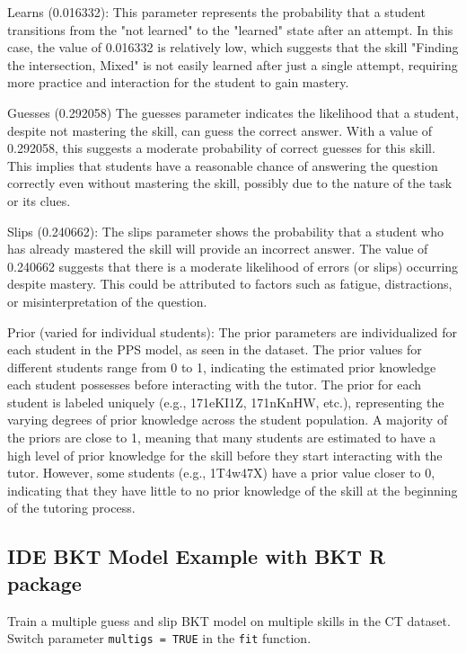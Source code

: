 \documentclass{article}
\begin{document}
Learns (0.016332): This parameter represents the probability that a student transitions from the "not learned" to the "learned" state after an attempt. In this case, the value of 0.016332 is relatively low, which suggests that the skill "Finding the intersection, Mixed" is not easily learned after just a single attempt, requiring more practice and interaction for the student to gain mastery.

Guesses (0.292058) The guesses parameter indicates the likelihood that a student, despite not mastering the skill, can guess the correct answer. With a value of 0.292058, this suggests a moderate probability of correct guesses for this skill. This implies that students have a reasonable chance of answering the question correctly even without mastering the skill, possibly due to the nature of the task or its clues.

Slips (0.240662): The slips parameter shows the probability that a student who has already mastered the skill will provide an incorrect answer. The value of 0.240662 suggests that there is a moderate likelihood of errors (or slips) occurring despite mastery. This could be attributed to factors such as fatigue, distractions, or misinterpretation of the question.

Prior (varied for individual students): The prior parameters are individualized for each student in the PPS model, as seen in the dataset. The prior values for different students range from 0 to 1, indicating the estimated prior knowledge each student possesses before interacting with the tutor. The prior for each student is labeled uniquely (e.g., 171eKI1Z, 171nKnHW, etc.), representing the varying degrees of prior knowledge across the student population. A majority of the priors are close to 1, meaning that many students are estimated to have a high level of prior knowledge for the skill before they start interacting with the tutor. However, some students (e.g., 1T4w47X) have a prior value closer to 0, indicating that they have little to no prior knowledge of the skill at the beginning of the tutoring process.

\subsection{IDE BKT Model Example with BKT R package}

Train a multiple guess and slip BKT model on multiple skills in the CT dataset. Switch parameter \texttt{multigs = TRUE} in the \texttt{fit} function.
\end{document}
